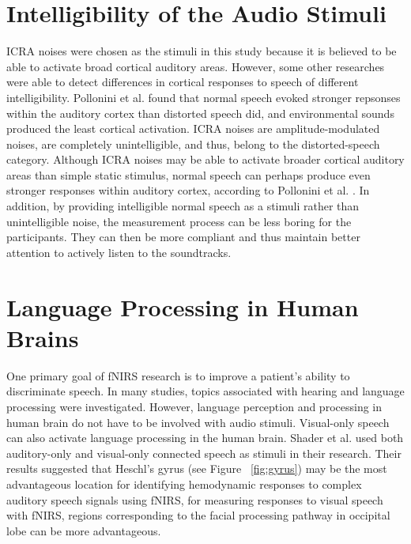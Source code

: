 \section{Intelligibility of the Audio Stimuli}
ICRA noises were chosen as the stimuli in this study because it is believed to be able to activate broad cortical auditory areas. However, some other researches were able to detect differences in cortical responses to speech of different intelligibility. Pollonini et al. \citeyearpar{Pollonini2013} found that normal speech evoked stronger repsonses within the auditory cortex than distorted speech did, and environmental sounds produced the least cortical activation. ICRA noises are amplitude-modulated noises, are completely unintelligible, and thus, belong to the distorted-speech category. Although ICRA noises may be able to activate broader cortical auditory areas than simple static stimulus, normal speech can perhaps produce even stronger responses within auditory cortex, according to Pollonini et al. \citeyearpar{Pollonini2013}. In addition, by providing intelligible normal speech as a stimuli rather than unintelligible noise, the measurement process can be less boring for the participants. They can then be more compliant and thus maintain better attention to actively listen to the soundtracks.

\section{Language Processing in Human Brains}
One primary goal of fNIRS research is to improve a patient's ability to discriminate speech. In many studies, topics associated with hearing and language processing were investigated. However, language perception and processing in human brain do not have to be involved with audio stimuli. Visual-only speech can also activate language processing in the human brain. Shader et al. \citeyearpar{Shader2021} used both auditory-only and visual-only connected speech as stimuli in their research. Their results suggested that Heschl's gyrus (see Figure ~\ref{fig:gyrus}) may be the most advantageous location for identifying hemodynamic responses to complex auditory speech signals using fNIRS, for measuring responses to visual speech with fNIRS, regions corresponding to the facial processing pathway in occipital lobe can be more advantageous.

